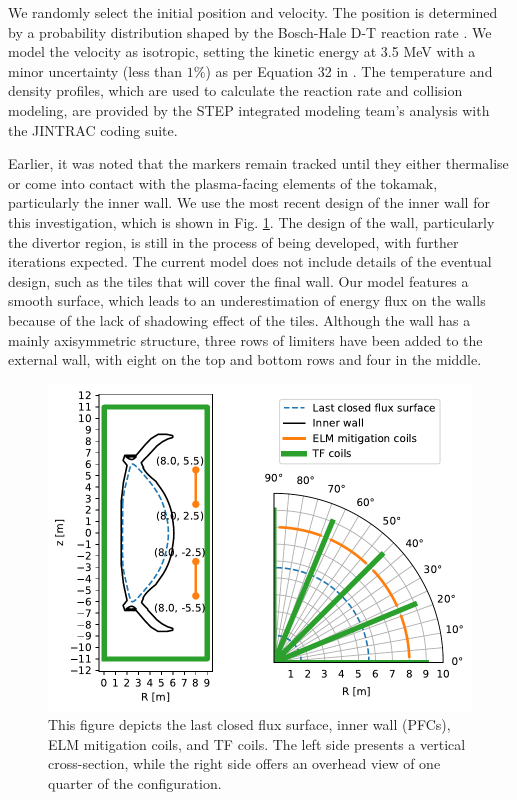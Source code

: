 \documentclass[10pt, a4paper, twoside]{article}
\begin{document}
We randomly select the initial position and velocity. The position is determined by a probability distribution shaped by the Bosch-Hale D-T reaction rate \cite{bosch1992}. We model the velocity as isotropic, setting the kinetic energy at 3.5 MeV with a minor uncertainty (less than $1\%$) as per Equation 32 in \cite{brysk1973}. The temperature and density profiles, which are used to calculate the reaction rate and collision modeling, are provided by the STEP integrated modeling team's analysis with the JINTRAC coding suite.

Earlier, it was noted that the markers remain tracked until they either thermalise or come into contact with the plasma-facing elements of the tokamak, particularly the inner wall. We use the most recent design of the inner wall for this investigation, which is shown in Fig. \ref{fig:lcfs_wall_elm_tf_coils}. The design of the wall, particularly the divertor region, is still in the process of being developed, with further iterations expected. The current model does not include details of the eventual design, such as the tiles that will cover the final wall. Our model features a smooth surface, which leads to an underestimation of energy flux on the walls because of the lack of shadowing effect of the tiles. Although the wall has a mainly axisymmetric structure, three rows of limiters have been added to the external wall, with eight on the top and bottom rows and four in the middle.

\begin{figure}[!htb]
    \centering
    \includegraphics[width=0.6\linewidth]{Figures/lcfs_wall_elm_tf_coils.pdf}
    \caption{This figure depicts the last closed flux surface, inner wall (PFCs), ELM mitigation coils, and TF coils. The left side presents a vertical cross-section, while the right side offers an overhead view of one quarter of the configuration.}
    \label{fig:lcfs_wall_elm_tf_coils}
\end{figure}
\end{document}
